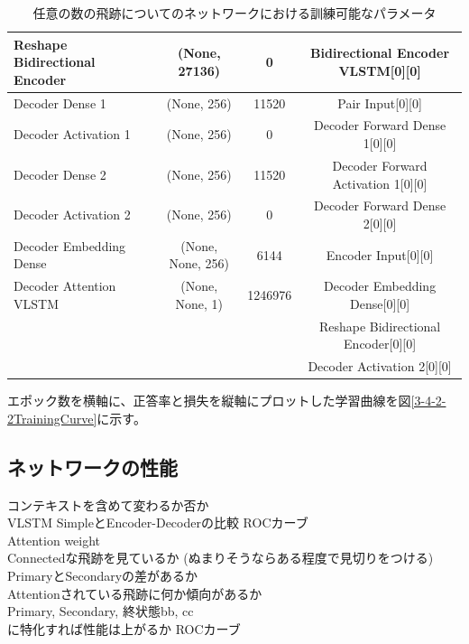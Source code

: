 \begin{table}[htb]
{\begin{tabular}{l c c c}
    Reshape Bidirectional Encoder & (None, 27136) & 0 & Bidirectional Encoder VLSTM[0][0]\\\hline\hline
    Decoder Dense 1 & (None, 256)　& 11520 & Pair Input[0][0]\\\hline
    Decoder Activation 1 & (None, 256)　& 0 & Decoder Forward Dense 1[0][0]\\\hline
    Decoder Dense 2 & (None, 256)　& 11520 & Decoder Forward Activation 1[0][0]\\\hline
    Decoder Activation 2 & (None, 256)　& 0 & Decoder Forward Dense 2[0][0]\\\hline\hline
    Decoder Embedding Dense & (None, None, 256) & 6144 & Encoder Input[0][0]\\\hline\hline
    Decoder Attention VLSTM & (None, None, 1) & 1246976 & Decoder Embedding Dense[0][0]\\
                                                                                                   &&& Reshape Bidirectional Encoder[0][0]\\                    
                                                                                                   &&& Decoder Activation 2[0][0]\\\hline\hline
  \end{tabular}
  }
  \caption{任意の数の飛跡についてのネットワークにおける訓練可能なパラメータ}
  \label{ParametersforVLSTMModel}
\end{table}

エポック数を横軸に、正答率と損失を縦軸にプロットした学習曲線を図\ref{3-4-2-2TrainingCurve}に示す。



\subsection{ネットワークの性能} \label{Net:VLSTM:PerformanceofVLSTM}

コンテキストを含めて変わるか否か\\
VLSTM SimpleとEncoder-Decoderの比較 ROCカーブ\\

Attention weight\\
Connectedな飛跡を見ているか (ぬまりそうならある程度で見切りをつける)\\
PrimaryとSecondaryの差があるか\\
Attentionされている飛跡に何か傾向があるか\\

Primary, Secondary, 終状態bb, cc\\
に特化すれば性能は上がるか ROCカーブ\\









